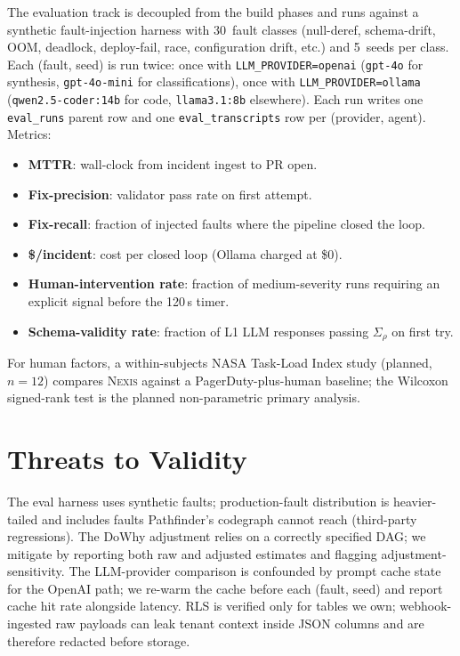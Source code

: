 \documentclass[manuscript,nonacm=true,screen=false,review=false]{acmart}
\begin{document}
The evaluation track is decoupled from the build phases and runs against a synthetic fault-injection harness with 30~fault classes (null-deref, schema-drift, OOM, deadlock, deploy-fail, race, configuration drift, etc.) and 5~seeds per class. Each (fault, seed) is run twice: once with \texttt{LLM\_PROVIDER=openai} (\texttt{gpt-4o} for synthesis, \texttt{gpt-4o-mini} for classifications), once with \texttt{LLM\_PROVIDER=ollama} (\texttt{qwen2.5-coder:14b} for code, \texttt{llama3.1:8b} elsewhere). Each run writes one \texttt{eval\_runs} parent row and one \texttt{eval\_transcripts} row per (provider, agent). Metrics:

\begin{itemize}
\item \textbf{MTTR}: wall-clock from incident ingest to PR open.
\item \textbf{Fix-precision}: validator pass rate on first attempt.
\item \textbf{Fix-recall}: fraction of injected faults where the pipeline closed the loop.
\item \textbf{\$/incident}: cost per closed loop (Ollama charged at \$0).
\item \textbf{Human-intervention rate}: fraction of medium-severity runs requiring an explicit signal before the 120\,s timer.
\item \textbf{Schema-validity rate}: fraction of L1 LLM responses passing $\Sigma_\rho$ on first try.
\end{itemize}

For human factors, a within-subjects NASA Task-Load Index study (planned, $n=12$) compares \textsc{Nexis} against a PagerDuty-plus-human baseline; the Wilcoxon signed-rank test is the planned non-parametric primary analysis.

\section{Threats to Validity}

The eval harness uses synthetic faults; production-fault distribution is heavier-tailed and includes faults Pathfinder's codegraph cannot reach (third-party regressions). The DoWhy adjustment relies on a correctly specified DAG; we mitigate by reporting both raw and adjusted estimates and flagging adjustment-sensitivity. The LLM-provider comparison is confounded by prompt cache state for the OpenAI path; we re-warm the cache before each (fault, seed) and report cache hit rate alongside latency. RLS is verified only for tables we own; webhook-ingested raw payloads can leak tenant context inside JSON columns and are therefore redacted before storage.
\end{document}
